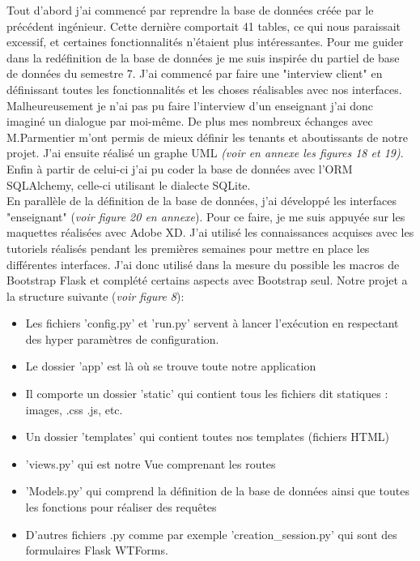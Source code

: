 \documentclass[12pt]{article}
\begin{document}
Tout d’abord j’ai commencé par reprendre la base de données créée par le précédent ingénieur. Cette dernière comportait 41 tables, ce qui nous paraissait excessif, et certaines fonctionnalités n'étaient plus intéressantes. Pour me guider dans la redéfinition de la base de données je me suis inspirée du partiel de base de données du semestre 7. J’ai commencé par faire une "interview client" en définissant toutes les fonctionnalités et les choses réalisables avec nos interfaces. Malheureusement je n’ai pas pu faire l’interview d’un enseignant j’ai donc imaginé un dialogue par moi-même. De plus mes nombreux échanges avec M.Parmentier m’ont permis de mieux définir les tenants et aboutissants de notre projet. J’ai ensuite réalisé un graphe UML \textit{(voir en annexe les figures 18 et 19)}. Enfin à partir de celui-ci j’ai pu coder la base de données avec l’ORM SQLAlchemy, celle-ci utilisant le dialecte SQLite. \\

En parallèle de la définition de la base de données, j’ai développé les interfaces "enseignant" (\textit{voir figure 20 en annexe}). Pour ce faire, je me suis appuyée sur les maquettes réalisées avec Adobe XD. J’ai utilisé les connaissances acquises avec les tutoriels réalisés pendant les premières semaines pour mettre en place les différentes interfaces. J’ai donc utilisé dans la mesure du possible les macros de Bootstrap Flask et complété certains aspects avec Bootstrap seul. 
Notre projet a la structure suivante (\textit{voir figure 8}):
\begin{itemize}
    \item Les fichiers 'config.py' et 'run.py' servent à lancer l'exécution en respectant des hyper paramètres de configuration.
    
    \item Le dossier 'app' est là où se trouve toute notre application
    
    \item Il comporte un dossier 'static' qui contient tous les fichiers dit statiques : images, .css .js, etc.
    
    \item  Un dossier 'templates' qui contient toutes nos templates (fichiers HTML)
    
    \item 'views.py' qui est notre Vue comprenant les routes
    
    \item 'Models.py' qui comprend la définition de la base de données ainsi que toutes les fonctions pour réaliser des requêtes
    
    \item D'autres fichiers .py comme par exemple 'creation\_session.py' qui sont des formulaires Flask WTForms.

\end{itemize}
\end{document}
